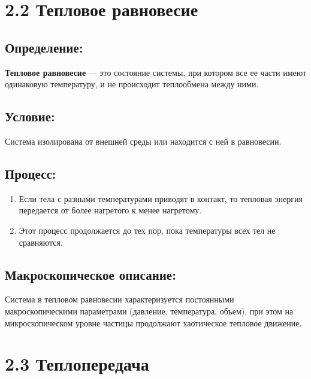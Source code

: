 \documentclass[a4paper,12pt]{article}
\begin{document}
\section*{2.2 Тепловое равновесие}
\vspace{-9pt}
\subsection*{Определение:}
\vspace{-3pt}
\textbf{Тепловое равновесие} — это состояние системы, при котором все ее части имеют одинаковую температуру, и не происходит теплообмена между ними.

\vspace{-9pt}
\subsection*{Условие:}
\vspace{-3pt}
Система изолирована от внешней среды или находится с ней в равновесии.

\vspace{-9pt}
\subsection*{Процесс:}
\vspace{-3pt}
\begin{enumerate}[itemsep=0pt, topsep=0pt, parsep=3pt]
    \item Если тела с разными температурами приводят в контакт, то тепловая энергия передается от более нагретого к менее нагретому.
    \item Этот процесс продолжается до тех пор, пока температуры всех тел не сравняются.
\end{enumerate}

\vspace{-9pt}
\subsection*{Макроскопическое описание:}
\vspace{-3pt}
Система в тепловом равновесии характеризуется постоянными макроскопическими параметрами (давление, температура, объем), при этом на микроскопическом уровне частицы продолжают хаотическое тепловое движение.


\section*{2.3 Теплопередача}
\vspace{-9pt}
\end{document}
